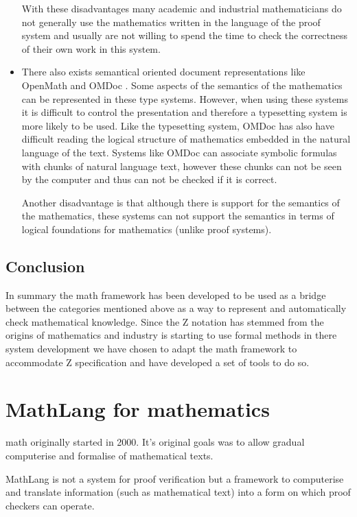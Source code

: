 \begin{itemize}
With these disadvantages many academic and industrial mathematicians do not
generally use the mathematics written in the language of the proof system and
usually are not willing to spend the time to check the correctness of their own
work in this system.

\item There also exists semantical oriented document representations like
OpenMath \cite{openmath} and OMDoc \cite{omdoc}. Some aspects of the semantics of
the mathematics can be represented in these type systems. However, when using
these systems it is difficult to control the presentation and therefore a
typesetting system is more likely to be used. Like the typesetting system,
 OMDoc has also have difficult reading the logical structure of
mathematics embedded in the natural language of the text. Systems like OMDoc can
associate symbolic formulas with chunks of natural language text, however these
chunks can not be seen by the computer and thus can not be checked if it is
correct.

Another disadvantage is that although there is support for the semantics of the
mathematics, these systems can not support the semantics in terms of logical
foundations for mathematics (unlike proof systems).
\end{itemize}


\subsection{Conclusion}

In summary the \gls{math} framework has been developed to be used as a bridge
between the categories mentioned above as a way to represent and automatically
check mathematical knowledge. Since the Z notation has stemmed from the origins
of mathematics and industry is starting to use formal methods in there system
development we have chosen to adapt the \gls{math} framework to accommodate Z
specification and have developed a set of tools to do so.

\section{MathLang for mathematics}
\label{sec:mathlangbackground}

\Gls{math} originally started in 2000. It's original goals was to allow gradual
\gls{computerise} and \gls{formalise} of mathematical texts.

MathLang is not a system for proof verification but a framework to computerise
and translate information (such as mathematical text) into a form on which proof
checkers can operate.

